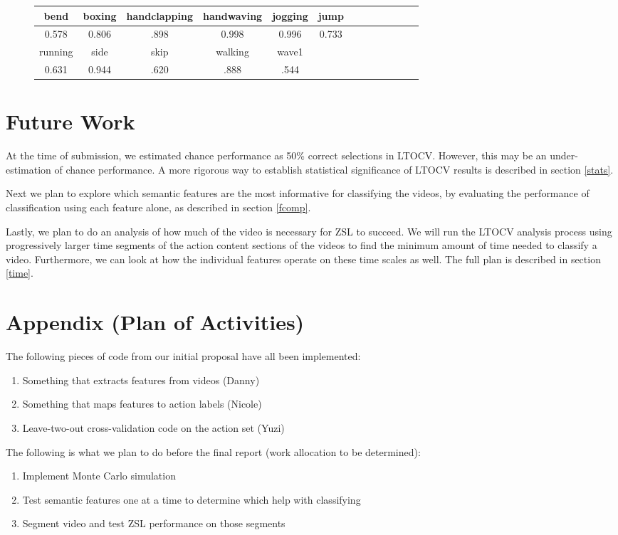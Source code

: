 \documentclass{article}
\begin{document}
\begin{figure}[h]
  \begin{center}
    \begin{tabular}{|c|c|c|c|c|c|c|c|c|c|c|c|c|}\hline
      bend &  boxing & handclapping & handwaving & jogging & jump\\\hline
      0.578 & 0.806  & .898         & 0.998      & 0.996  &  0.733\\\hline\cline{1-5}
      running &  side  & skip & walking & wave1 \\\cline{1-5}
      0.631   &  0.944 & .620 & .888    & .544 \\\cline{1-5}
    \end{tabular}
  \end{center}
\end{figure}

\section{Future Work} %
At the time of submission, we estimated chance performance as 50\% correct selections in LTOCV. However, this may be an under-estimation of chance performance. A more rigorous way to establish statistical significance of LTOCV results is described in section \ref{stats}.

Next we plan to explore which semantic features are the most informative for classifying the videos, by evaluating the performance of classification using each feature alone, as described in section \ref{fcomp}.

Lastly, we plan to do an analysis of how much of the video is necessary for ZSL to succeed. We will run the LTOCV analysis process using progressively larger time segments of the action content sections of the videos to find the minimum amount of time needed to classify a video. Furthermore, we can look at how the individual features operate on these time scales as well. The full plan is described in section \ref{time}.

\section*{Appendix (Plan of Activities)}
The following pieces of code from our initial proposal have all been implemented:
\begin{enumerate}
\item Something that extracts features from videos (Danny)
\item Something that maps features to action labels (Nicole)
\item Leave-two-out cross-validation code on the action set (Yuzi)
\end{enumerate}
The following is what we plan to do before the final report (work allocation to be determined):
\begin{enumerate}
\item Implement Monte Carlo simulation
\item Test semantic features one at a time to determine which help with classifying
\item Segment video and test ZSL performance on those segments
\end{enumerate}



\end{document}

